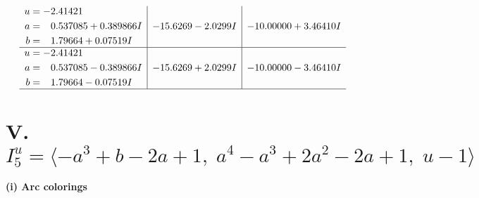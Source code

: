 \documentclass[1p]{elsarticle_modified}
\theoremstyle{definition}
\begin{document}
$$\begin{array}{c|c|c}
\begin{aligned}
u &= -2.41421\phantom{ +0.000000I} \\
a &= \phantom{-}0.537085 + 0.389866 I \\
b &= \phantom{-}1.79664 + 0.07519 I\end{aligned}
 & -15.6269 - 2.0299 I & -10.00000 + 3.46410 I \\ \hline\begin{aligned}
u &= -2.41421\phantom{ +0.000000I} \\
a &= \phantom{-}0.537085 - 0.389866 I \\
b &= \phantom{-}1.79664 - 0.07519 I\end{aligned}
 & -15.6269 + 2.0299 I & -10.00000 - 3.46410 I\\
 \hline 
 \end{array}$$\newpage\newpage\renewcommand{\arraystretch}{1}
\centering \section*{V. $I^u_{5}= \langle - a^3+b-2 a+1,\;a^4- a^3+2 a^2-2 a+1,\;u-1 \rangle$}
\flushleft \textbf{(i) Arc colorings}\\
\end{document}
